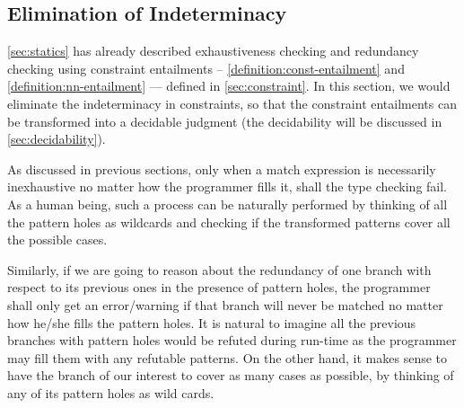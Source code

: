 
\subsection{Elimination of Indeterminacy}\label{sec:algorithm}

\autoref{sec:statics} has already described exhaustiveness checking and redundancy checking using constraint entailments -- \autoref{definition:const-entailment} and
\autoref{definition:nn-entailment} --- defined in \autoref{sec:constraint}. 
In this section, we would eliminate the indeterminacy in constraints, so that the constraint entailments can be transformed into a decidable judgment (the decidability will be discussed in \autoref{sec:decidability}).

As discussed in previous sections, only when a match expression is necessarily inexhaustive no matter how the programmer fills it, shall the type checking fail. As a human being, such a process can be naturally performed by thinking of all the pattern holes as wildcards and checking if the transformed patterns cover all the possible cases. 

Similarly, if we are going to reason about the redundancy of one branch with respect to its previous ones in the presence of pattern holes, the programmer shall only get an error/warning if that branch will never be matched no matter how he/she fills the pattern holes. It is natural to imagine all the previous branches with pattern holes would be refuted during run-time as the programmer may fill them with any refutable patterns. On the other hand, it makes sense to have the branch of our interest to cover as many cases as possible, by thinking of any of its pattern holes as wild cards.%


